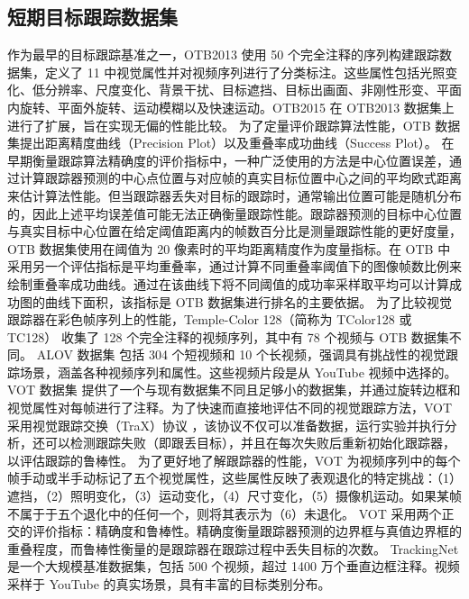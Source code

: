 \subsection{短期目标跟踪数据集}
作为最早的目标跟踪基准之一，OTB2013 \cite{OTB} 使用 50 个完全注释的序列构建跟踪数据集，定义了 11 中视觉属性并对视频序列进行了分类标注。这些属性包括光照变化、低分辨率、尺度变化、背景干扰、目标遮挡、目标出画面、非刚性形变、平面内旋转、平面外旋转、运动模糊以及快速运动。OTB2015 \cite{OTB2015} 在 OTB2013 数据集上进行了扩展，旨在实现无偏的性能比较。
为了定量评价跟踪算法性能，OTB 数据集提出距离精度曲线（Precision Plot）以及重叠率成功曲线（Success Plot）。
在早期衡量跟踪算法精确度的评价指标中，一种广泛使用的方法是中心位置误差，通过计算跟踪器预测的中心点位置与对应帧的真实目标位置中心之间的平均欧式距离来估计算法性能。但当跟踪器丢失对目标的跟踪时，通常输出位置可能是随机分布的，因此上述平均误差值可能无法正确衡量跟踪性能。跟踪器预测的目标中心位置与真实目标中心位置在给定阈值距离内的帧数百分比是测量跟踪性能的更好度量，OTB 数据集使用在阈值为 20 像素时的平均距离精度作为度量指标。在 OTB 中采用另一个评估指标是平均重叠率，通过计算不同重叠率阈值下的图像帧数比例来绘制重叠率成功曲线。通过在该曲线下将不同阈值的成功率采样取平均可以计算成功图的曲线下面积，该指标是 OTB 数据集进行排名的主要依据。
为了比较视觉跟踪器在彩色帧序列上的性能，Temple-Color 128（简称为 TColor128 或 TC128）\cite{TC128} 收集了 128 个完全注释的视频序列，其中有 78 个视频与 OTB 数据集不同。
ALOV 数据集 \cite{ALOV} 包括 304 个短视频和 10 个长视频，强调具有挑战性的视觉跟踪场景，涵盖各种视频序列和属性。这些视频片段是从 YouTube 视频中选择的。
VOT 数据集 \cite{VOT2015} 提供了一个与现有数据集不同且足够小的数据集，并通过旋转边框和视觉属性对每帧进行了注释。为了快速而直接地评估不同的视觉跟踪方法，VOT 采用视觉跟踪交换（TraX）协议 \cite{TraX}，该协议不仅可以准备数据，运行实验并执行分析，还可以检测跟踪失败（即跟丢目标），并且在每次失败后重新初始化跟踪器，以评估跟踪的鲁棒性。
为了更好地了解跟踪器的性能，VOT 为视频序列中的每个帧手动或半手动标记了五个视觉属性，这些属性反映了表观退化的特定挑战：（1）遮挡，（2）照明变化，（3）运动变化，（4）尺寸变化，（5）摄像机运动。如果某帧不属于于五个退化中的任何一个，则将其表示为（6）未退化。
VOT 采用两个正交的评价指标：精确度和鲁棒性。精确度衡量跟踪器预测的边界框与真值边界框的重叠程度，而鲁棒性衡量的是跟踪器在跟踪过程中丢失目标的次数。
TrackingNet \cite{muller2018trackingnet} 是一个大规模基准数据集，包括 500 个视频，超过 1400 万个垂直边框注释。视频采样于 YouTube 的真实场景，具有丰富的目标类别分布。
